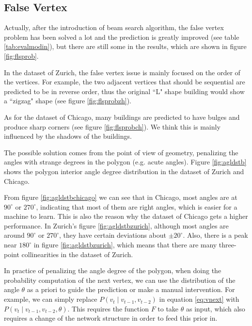 \subsection{False Vertex}\label{flsvtx}
Actually, after the introduction of beam search algorithm, the false vertex problem has been solved a lot and the prediction is greatly improved (see table \ref{tab:evalmodin}), but there are still some in the results, which are shown in figure \ref{fig:flsprob}.

In the dataset of Zurich, the false vertex issue is mainly focused on the order of the vertices. For example, the two adjacent vertices that should be sequential are predicted to be in reverse order, thus the original ``L" shape building would show a ``zigzag" shape (see figure \ref{fig:flsprobzh}).

As for the dataset of Chicago, many buildings are predicted to have bulges and produce sharp corners (see figure \ref{fig:flsprobch}). We think this is mainly influenced by the shadows of the buildings.



The possible solution comes from the point of view of geometry, penalizing the angles with strange degrees in the polygon (e.g. acute angles). Figure \ref{fig:agldstb} shows the polygon interior angle degree distribution in the dataset of Zurich and Chicago.



From figure \ref{fig:agldstbchicago} we can see that in Chicago, most angles are at $90^\circ$ or $270^\circ$, indicating that most of them are right angles, which is easier for a machine to learn. This is also the reason why the dataset of Chicago gets a higher performance. In Zurich's figure \ref{fig:agldstbzurich}, although most angles are around $90^\circ$ or $270^\circ$, they have certain deviations about $\pm20^\circ$. Also, there is a peak near $180^\circ$ in figure \ref{fig:agldstbzurich}, which means that there are many three-point collinearities in the dataset of Zurich.

In practice of penalizing the angle degree of the polygon, when doing the probability computation of the next vertex, we can use the distribution of the angle $\theta$ as a priori to guide the prediction or make a manual intervention. For example, we can simply replace $P(v_t \mid v_{t-1}, v_{t-2})$ in equation \ref{eq:vnext} with $P(v_t \mid v_{t-1}, v_{t-2}, \theta)$. This requires the function $F$ to take $\theta$ as input, which also requires a change of the network structure in order to feed this prior in.

